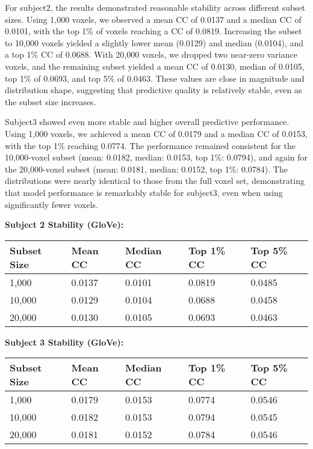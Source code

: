 \documentclass[11pt]{article}
\begin{document}
For subject2, the results demonstrated reasonable stability across
different subset sizes. Using 1,000 voxels, we observed a mean CC of
0.0137 and a median CC of 0.0101, with the top 1\% of voxels reaching a
CC of 0.0819. Increasing the subset to 10,000 voxels yielded a slightly
lower mean (0.0129) and median (0.0104), and a top 1\% CC of 0.0688.
With 20,000 voxels, we dropped two near-zero variance voxels, and the
remaining subset yielded a mean CC of 0.0130, median of 0.0105, top 1\%
of 0.0693, and top 5\% of 0.0463. These values are close in magnitude
and distribution shape, suggesting that predictive quality is relatively
stable, even as the subset size increases.

Subject3 showed even more stable and higher overall predictive
performance. Using 1,000 voxels, we achieved a mean CC of 0.0179 and a
median CC of 0.0153, with the top 1\% reaching 0.0774. The performance
remained consistent for the 10,000-voxel subset (mean: 0.0182, median:
0.0153, top 1\%: 0.0794), and again for the 20,000-voxel subset (mean:
0.0181, median: 0.0152, top 1\%: 0.0784). The distributions were nearly
identical to those from the full voxel set, demonstrating that model
performance is remarkably stable for subject3, even when using
significantly fewer voxels.

\textbf{Subject 2 Stability (GloVe):}

\begin{longtable}[]{@{}lllll@{}}
\toprule
Subset Size & Mean CC & Median CC & Top 1\% CC & Top 5\% CC \\
\midrule
\endhead
1,000 & 0.0137 & 0.0101 & 0.0819 & 0.0485 \\
10,000 & 0.0129 & 0.0104 & 0.0688 & 0.0458 \\
20,000 & 0.0130 & 0.0105 & 0.0693 & 0.0463 \\
\bottomrule
\end{longtable}

\textbf{Subject 3 Stability (GloVe):}

\begin{longtable}[]{@{}lllll@{}}
\toprule
Subset Size & Mean CC & Median CC & Top 1\% CC & Top 5\% CC \\
\midrule
\endhead
1,000 & 0.0179 & 0.0153 & 0.0774 & 0.0546 \\
10,000 & 0.0182 & 0.0153 & 0.0794 & 0.0545 \\
20,000 & 0.0181 & 0.0152 & 0.0784 & 0.0546 \\
\bottomrule
\end{longtable}
\end{document}
